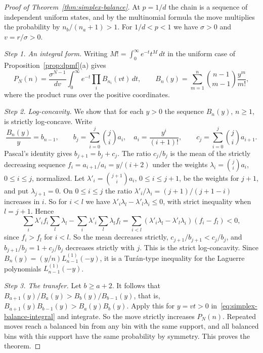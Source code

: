 \begin{proof}[Proof of Theorem~\ref{thm:simplex-balance}]
At $p=1/d$ the chain is a sequence of independent uniform states, and by the
multinomial formula the move multiplies the probability by $n_b/(n_a+1)>1$. For $1/d<p<1$ we have $\sigma>0$ and $v=r/\sigma>0$.

\emph{Step 1. An integral form.} Writing $M!=\int_0^\infty e^{-t}t^M\,dt$ in the
uniform case of Proposition~\ref{prop:dpmf}(a) gives
\begin{equation}\label{eq:simplex-balance-integral}
P_N(n)=\frac{\sigma^{N-1}}{dv}\int_0^\infty e^{-t}
\prod_iB_{n_i}(vt)\,dt,\qquad
B_n(y)=\sum_{m=1}^n\binom{n-1}{m-1}\frac{y^m}{m!},
\end{equation}
where the product runs over the positive coordinates.

\emph{Step 2. Log-concavity.} We show that for each $y>0$ the sequence $B_n(y)$,
$n\ge1$, is strictly log-concave. Write
\[
\frac{B_n(y)}y=b_{n-1},\qquad
b_j=\sum_{i=0}^j\binom ji a_i,\quad
a_i=\frac{y^i}{(i+1)!},\qquad
c_j=\sum_{i=0}^j\binom ji a_{i+1}.
\]
Pascal's identity gives $b_{j+1}=b_j+c_j$. The ratio $c_j/b_j$ is the mean of the
strictly decreasing sequence $f_i=a_{i+1}/a_i=y/(i+2)$ under the weights
$\lambda_i=\binom jia_i$, $0\le i\le j$, normalized. Let $\lambda'_i=\binom{j+1}ia_i$,
$0\le i\le j+1$, be the weights for $j+1$, and put $\lambda_{j+1}=0$. On
$0\le i\le j$ the ratio $\lambda'_i/\lambda_i=(j+1)/(j+1-i)$ increases in $i$. So for
$i<l$ we have $\lambda'_i\lambda_l-\lambda'_l\lambda_i\le0$, with strict inequality when
$l=j+1$. Hence
\[
\sum_i\lambda'_if_i\sum_l\lambda_l-\sum_i\lambda'_i\sum_l\lambda_lf_l
=\sum_{i<l}(\lambda'_i\lambda_l-\lambda'_l\lambda_i)(f_i-f_l)<0,
\]
since $f_i>f_l$ for $i<l$. So the mean decreases strictly, $c_{j+1}/b_{j+1}<c_j/b_j$,
and $b_{j+1}/b_j=1+c_j/b_j$ decreases strictly with $j$. This is the strict
log-concavity. Since $B_n(y)=(y/n)L^{(1)}_{n-1}(-y)$, it is a Tur\'an-type
inequality for the Laguerre polynomials $L^{(1)}_{n-1}(-y)$.

\emph{Step 3. The transfer.} Let $b\ge a+2$. It follows that
$B_{a+1}(y)/B_a(y)>B_b(y)/B_{b-1}(y)$, that is,
$B_{a+1}(y)B_{b-1}(y)>B_a(y)B_b(y)$. Apply this
for $y=vt>0$ in~\eqref{eq:simplex-balance-integral} and integrate. So the move
strictly increases $P_N(n)$. Repeated moves reach a balanced bin from any bin
with the same support, and all balanced bins with this support have the same
probability by symmetry. This proves the theorem.
\end{proof}

